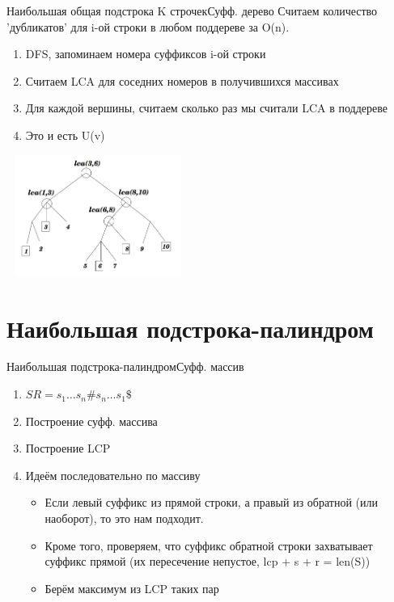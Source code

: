 \documentclass[10pt]{beamer}
\begin{document}
\begin{frame}[fragile]{Наибольшая общая подстрока K строчек}{Суфф. дерево}
Считаем количество 'дубликатов' для i-ой строки в любом поддереве за O(n).
\begin{enumerate}
    \item DFS, запоминаем номера суффиксов i-ой строки
    \item Считаем LCA для соседних номеров в получившихся массивах
    \item Для каждой вершины, считаем сколько раз мы считали LCA в поддереве
    \item Это и есть U(v)
\end{enumerate}
\begin{center}
    \includegraphics[width=6cm, height=4cm]{Term_3/Source/Pictures/Uv.jpg}
\end{center}
\end{frame}

\section{Наибольшая подстрока-палиндром}
\begin{frame}[fragile]{Наибольшая подстрока-палиндром}{Суфф. массив}
\begin{enumerate}
    \item $SR = s_1 \dots s_n \# s_n \dots s_1 \$$
    \item Построение суфф. массива
    \item Построение LCP
    \item Идеём последовательно по массиву
    \begin{itemize}
        \item Если левый суффикс из прямой строки, а правый из обратной (или наоборот), то это нам подходит.
        \item Кроме того, проверяем, что суффикс обратной строки захватывает суффикс прямой (их пересечение непустое, lcp + s + r = len(S))
        \item Берём максимум из LCP таких пар
    \end{itemize} 
\end{enumerate}
\end{frame}
\end{document}
